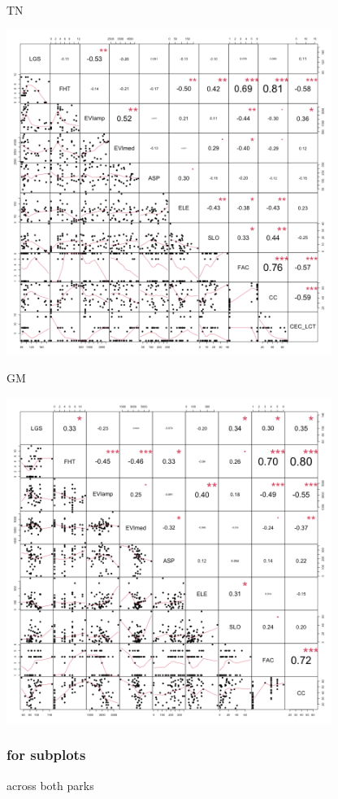 \documentclass[
  letterpaper,
  DIV=11,
  numbers=noendperiod]{scrartcl}
\begin{document}
TN

\includegraphics[width=4.16667in,height=\textheight]{correlation plots/chart_site_TN.png}

GM

\includegraphics[width=4.16667in,height=\textheight]{correlation plots/chart_site_GM.png}

\hypertarget{for-subplots}{%
\subsubsection{for subplots}\label{for-subplots}}

across both parks
\end{document}
